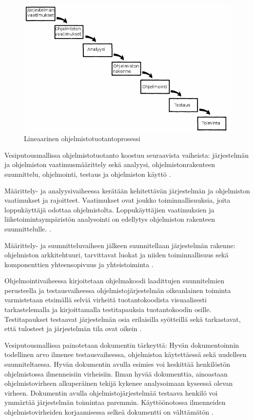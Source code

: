 \documentclass[finnish]{tktltiki2}
\theoremstyle{definition}
\theoremstyle{remark}
\begin{document}
\begin{figure}[h!]
\caption{Lineaarinen ohjelmistotuotantoprosessi}
\centering
\includegraphics[width=\textwidth]{waterfall}
\end{figure}

Vesiputousmallissa ohjelmistotuotanto koostuu seuraavista vaiheista: järjestelmän ja ohjelmiston vaatimusmäärittely sekä analyysi, ohjelmistonrakenteen suunnittelu, ohjelmointi, testaus ja ohjelmiston käyttö \cite{ROY70}.

Määrittely- ja analyysivaiheessa kerätään kehitettävän järjestelmän ja ohjelmiston vaatimukset ja rajoitteet. Vaatimukset ovat joukko toiminnallisuuksia, joita loppukäyttäjä odottaa ohjelmistolta. Loppukäyttäjien vaatimuksien ja liiketoimintaympäristön analysointi on edellytys ohjelmiston rakenteen suunnittelulle. \cite{ROY70}.

Määrittely- ja suunnitteluvaiheen jälkeen suunnitellaan järjestelmän rakenne: ohjelmiston arkkitehtuuri, tarvittavat luokat ja niiden toiminnallisuus sekä komponenttien yhteensopivuus ja yhteistoiminta \cite{ROY70}.

Ohjelmointivaiheessa kirjoitetaan ohjelmakoodi laadittujen suunnitelmien perusteella ja testausvaiheessa ohjelmistojärjestelmän oikeanlainen toiminta varmistetaan etsimällä selviä virheitä tuotantokoodista visuaalisesti tarkastelemalla ja kirjoittamalla testitapauksia tuotantokoodin osille. Testitapaukset testaavat järjestelmän osia erilaisilla syötteillä sekä tarkastavat, että tulosteet ja järjestelmän tila ovat oikein  \cite{ROY70}.

Vesiputousmallissa painotetaan dokumentin tärkeyttä: Hyvän dokumentoinnin todellinen arvo ilmenee testausvaiheessa, ohjelmistoa käytettäessä sekä uudelleen suunniteltaessa. Hyvän dokumentin avulla esimies voi keskittää henkilöstön ohjelmistossa ilmenneisiin virheisiin. Ilman hyvää dokumenttia, ainoastaan ohjelmistovirheen alkuperäinen tekijä kykenee analysoimaan kyseessä olevan virheen. Dokumentin avulla ohjelmistojärjestelmää testaava henkilö voi ymmärtää järjestelmän toimintaa paremmin. Käyttöönotossa ilmenneiden ohjelmistovirheiden korjaamisessa selkeä dokumentti on välttämätön \cite{ROY70}.
\end{document}
